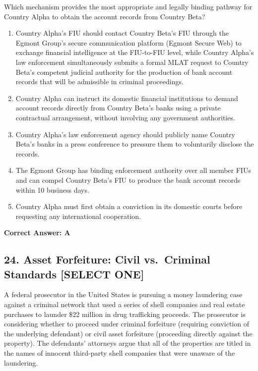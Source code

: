 \documentclass[11pt,a4paper]{article}
\begin{document}
	Which mechanism provides the most appropriate and legally binding pathway for Country Alpha to obtain the account records from Country Beta?
	
	\begin{enumerate}[label=\Alph*.]
		\item Country Alpha's FIU should contact Country Beta's FIU through the Egmont Group's secure communication platform (Egmont Secure Web) to exchange financial intelligence at the FIU-to-FIU level, while Country Alpha's law enforcement simultaneously submits a formal MLAT request to Country Beta's competent judicial authority for the production of bank account records that will be admissible in criminal proceedings.
		\item Country Alpha can instruct its domestic financial institutions to demand account records directly from Country Beta's banks using a private contractual arrangement, without involving any government authorities.
		\item Country Alpha's law enforcement agency should publicly name Country Beta's banks in a press conference to pressure them to voluntarily disclose the records.
		\item The Egmont Group has binding enforcement authority over all member FIUs and can compel Country Beta's FIU to produce the bank account records within 10 business days.
		\item Country Alpha must first obtain a conviction in its domestic courts before requesting any international cooperation.
	\end{enumerate}
	\textbf{Correct Answer: A}
	
	\subsection{24. Asset Forfeiture: Civil vs.\ Criminal Standards \textnormal{[SELECT ONE]}}
	
	A federal prosecutor in the United States is pursuing a money laundering case against a criminal network that used a series of shell companies and real estate purchases to launder \$22 million in drug trafficking proceeds. The prosecutor is considering whether to proceed under criminal forfeiture (requiring conviction of the underlying defendant) or civil asset forfeiture (proceeding directly against the property). The defendants' attorneys argue that all of the properties are titled in the names of innocent third-party shell companies that were unaware of the laundering.
	
\end{document}
